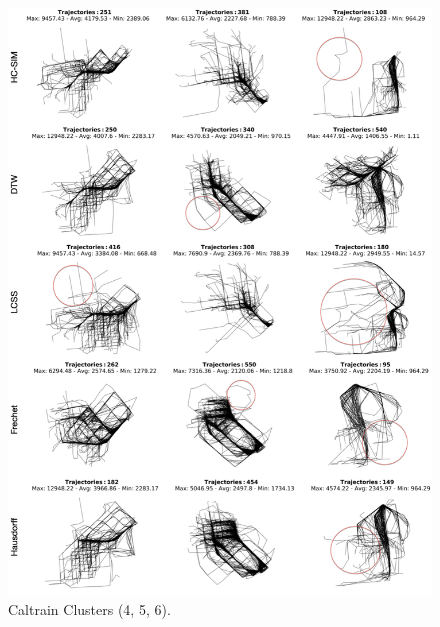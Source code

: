 \documentclass[a4paper, 12pt]{article}
\begin{document}
\begin{figure}[htbp!]
    \centering
    \includegraphics[width=1\textwidth]{Caltrain 2.png}
    \caption{Caltrain Clusters (4, 5, 6).}
    \label{fig41}
\end{figure}
\end{document}

